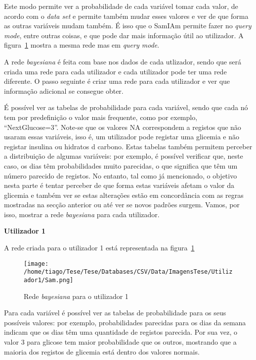 Este modo permite ver a probabilidade de cada variável tomar cada valor, de acordo com o \textit{data set} e permite também mudar esses valores e ver de que forma as outras variáveis mudam também. É isso que o \ac{SamIAm} permite fazer no \textit{query mode}, entre outras coisas, e que pode dar mais informação útil ao utilizador. A figura~\ref{fig:sam1} mostra a mesma rede mas em \textit{query mode}.

A rede \textit{bayesiana} é feita com base nos dados de cada utlizador, sendo que será criada uma rede para cada utilizador e cada utilizador pode ter uma rede diferente. O passo seguinte é criar uma rede para cada utilizador e ver que informação adicional se consegue obter.

É possível ver as tabelas de probabilidade para cada variável, sendo que cada nó tem por predefinição o valor mais frequente, como por exemplo, ``Next\textunderscore Glucose=3''. Note-se que os valores \ac{NA} correspondem a registos que não usaram essas variáveis, isso é, um utilizador pode registar uma glicemia e não registar insulina ou hidratos d carbono. Estas tabelas também permitem perceber a distribuição de algumas variáveis: por exemplo, é possível verificar que, neste caso, os dias têm probabilidades muito parecidas, o que significa que têm um número parecido de registos. No entanto, tal como já mencionado, o objetivo nesta parte é tentar perceber de que forma estas variáveis afetam o valor da glicemia e também ver se estas alterações estão em concordância com as regras mostradas na secção anterior ou até ver se novos padrões surgem. Vamos, por isso, mostrar a rede \textit{bayesiana} para cada utilizador. 

\textbf{Utilizador 1}

A rede criada para o utilizador 1 está representada na figura~\ref{fig:sam1}

\begin{figure}[H]
\centering
\texttt{[image: /home/tiago/Tese/Tese/Databases/CSV/Data/ImagensTese/Utilizador1/Sam.png]}
\caption{Rede \textit{bayesiana} para o utilizador 1}
\label{fig:sam1}
\end{figure}
Para cada variável é possível ver as tabelas de probabilidade para os seus possíveis valores: por exemplo, probabilidades parecidas para os dias da semana indicam que os dias têm uma quantidade de registos parecida. Por sua vez, o valor 3 para glicose tem maior probabilidade que os outros, mostrando que a maioria dos registos de glicemia está dentro dos valores normais.

